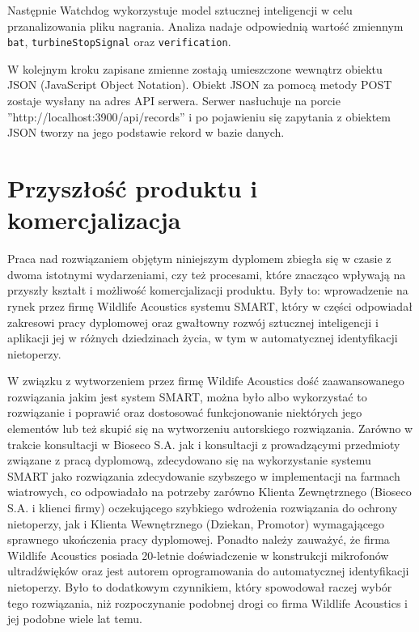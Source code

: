 \documentclass{sprz}
\begin{document}
Następnie Watchdog wykorzystuje model sztucznej inteligencji w celu przanalizowania pliku nagrania. Analiza nadaje odpowiednią wartość zmiennym \verb|bat|, \verb|turbineStopSignal| oraz \verb|verification|.

W kolejnym kroku zapisane zmienne zostają umieszczone wewnątrz obiektu JSON (JavaScript Object Notation). Obiekt JSON za pomocą metody POST zostaje wysłany na adres API serwera. Serwer nasłuchuje na porcie ”http://localhost:3900/api/records” i po pojawieniu się zapytania z obiektem JSON tworzy na jego podstawie rekord w bazie danych.

\chapter{Przyszłość produktu i komercjalizacja}

Praca nad rozwiązaniem objętym niniejszym dyplomem zbiegła się w czasie z dwoma istotnymi wydarzeniami, czy też procesami, które znacząco wpływają na przyszły kształt i możliwość komercjalizacji produktu. Były to: wprowadzenie na rynek przez firmę Wildlife Acoustics systemu SMART, który w części odpowiadał zakresowi pracy dyplomowej oraz gwałtowny rozwój sztucznej inteligencji i aplikacji jej w różnych dziedzinach życia, w tym w automatycznej identyfikacji nietoperzy.

W związku z wytworzeniem przez firmę Wildife Acoustics dość zaawansowanego rozwiązania jakim jest system SMART, można było albo wykorzystać to rozwiązanie i poprawić oraz dostosować funkcjonowanie niektórych jego elementów lub też skupić się na wytworzeniu autorskiego rozwiązania. Zarówno w trakcie konsultacji w Bioseco S.A. jak i konsultacji z prowadzącymi przedmioty związane z pracą dyplomową, zdecydowano się na wykorzystanie systemu SMART jako rozwiązania zdecydowanie szybszego w implementacji na farmach wiatrowych, co odpowiadało na potrzeby zarówno Klienta Zewnętrznego (Bioseco S.A. i klienci firmy) oczekującego szybkiego wdrożenia rozwiązania do ochrony nietoperzy, jak i Klienta Wewnętrznego (Dziekan, Promotor) wymagającego sprawnego ukończenia pracy dyplomowej.
Ponadto należy zauważyć, że firma Wildlife Acoustics posiada 20-letnie doświadczenie w konstrukcji mikrofonów ultradźwięków oraz jest autorem oprogramowania do automatycznej identyfikacji nietoperzy. Było to dodatkowym czynnikiem, który spowodował raczej wybór tego rozwiązania, niż rozpoczynanie podobnej drogi co firma Wildlife Acoustics i jej podobne wiele lat temu.
\end{document}
